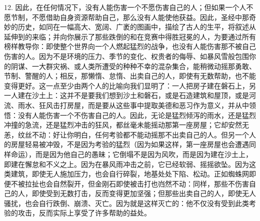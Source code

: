 12. 因此，在任何情况下，没有人能伤害一个不愿伤害自己的人；但如果一个人不愿节制，不愿借助自身资源帮助自己，那么没有人能使他获益。因此，圣经中那奇妙的历史，如同在一幅高大、宽阔、广袤的图画中，描绘了古人的生平，将叙述从延伸到的来临；并向你展示了那些跌倒的和在竞赛中得胜冠冕的人，为要通过所有榜样教导你：即使整个世界向一个人燃起猛烈的战争，也没有人能伤害那不被自己伤害的人。因为不是环境的压力、季节的变化、权贵者的侮辱、如暴风雪般包围你的阴谋、一大群灾祸、或人类所遭受的种种不幸的混杂集合，能稍微动摇那勇敢、节制、警醒的人；相反，那懒惰、怠惰、出卖自己的人，即使有无数帮助，也不能变得更好。这一点至少由两个人的比喻向我们显明了：一人把房子建在磐石上，另一人建在沙土上：这并不是要我们想到沙土和磐石，或是石造建筑和屋顶，或是河流、雨水、狂风击打房屋，而是要从这些事中提取美德和恶习作为意义，并从中领悟：没有人能伤害一个不伤害自己的人。因此，无论是猛烈倾泻的雨水，还是猛烈冲撞的急流，还是猛烈冲击的狂风，都丝毫未能摇动那第一座房屋；它却安然无恙，纹丝不动：好让你明白，任何考验都不能动摇那不出卖自己的人。但另一个人的房屋轻易被冲毁，不是因为考验的猛烈（因为如果这样，第一座房屋也会遭遇同样命运），而是因为他自己的愚昧；它倒塌不是因为风吹，而是因为建在沙土上，即建在懈怠和不义之上。因为在暴风雨冲击之前，它已经软弱、摇摇欲坠。因为这类建筑，即使无人施加压力，也会自行碎裂，地基处处下陷、松动。正如蜘蛛网即便不被拉扯也会自然裂开，但金刚石即使被击打也岿然不动：同样，那些不伤害自己的人，即使受到无数打击，反而变得更加坚强；但那些出卖自己的人，即使无人骚扰，也会自行跌倒、崩溃、灭亡。因为就是这样灭亡的：他不仅没有受到此类考验的攻击，反而实际上享受了许多帮助的益处。\par

